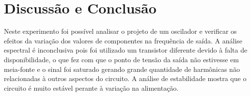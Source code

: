 \newpage
\section{Discussão e Conclusão}
Neste experimento foi possível analisar o projeto de um oscilador e verificar os efeitos da variação dos valores de componentes na frequência de saída. A análise espectral é inconclusiva pois foi utilizado um transistor diferente devido à falta de disponibilidade, o que fez com que o ponto de tensão da saída não estivesse em meia-fonte e o sinal foi saturado gerando grande quantidade de harmônicas não relacionadas à outros aspectos do circuito. A análise de estabilidade mostra que o circuito é muito estável perante à variação na alimentação.